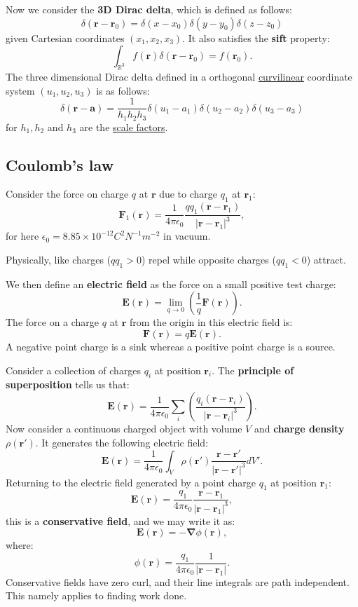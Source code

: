 \documentclass{article}
\begin{document}
Now we consider the \textbf{3D Dirac delta}, which is defined as follows:
$$\delta(\boldsymbol{r}-\boldsymbol{r}_0)=\delta(x-x_0)\delta(y-y_0)\delta(z-z_0)$$
given Cartesian coordinates $(x_1, x_2, x_3)$. It also satisfies the \textbf{sift} property:
$$\int_{\mathbb{R}^3}f(\boldsymbol{r})\delta(\boldsymbol{r}-\boldsymbol{r}_0)
=f(\boldsymbol{r}_0).$$
The three dimensional Dirac delta defined in a orthogonal \underline{curvilinear} coordinate system $(u_1, u_2, u_3)$ is as follows:
$$\delta(\boldsymbol{r}-\boldsymbol{a})=\frac{1}{h_1 h_2 h_3}
\delta(u_1-a_1)\delta(u_2-a_2)\delta(u_3-a_3)$$
for $h_1, h_2$ and $h_3$ are the \underline{scale factors}.

\newpage

\subsection{Coulomb's law}
Consider the force on charge $q$ at $\boldsymbol{r}$ due to charge $q_1$
at $\boldsymbol{r}_1$:
$$\boldsymbol{F}_1(\boldsymbol{r})=\frac{1}{4\pi\epsilon_0}
\frac{qq_1(\boldsymbol{r}-\boldsymbol{r}_1)}{|\boldsymbol{r}-\boldsymbol{r}_1|^3},$$
for here $\epsilon_0=8.85\times10^{-12}C^2N^{-1}m^{-2}$ in vacuum. 

Physically, like charges ($qq_1>0$) repel while opposite charges ($qq_1<0$) attract.

We then define an \textbf{electric field} as the force on a small positive test charge:
$$\boldsymbol{E}(\boldsymbol{r})=
\lim_{q\rightarrow 0}\left(\frac{1}{q}\boldsymbol{F}(\boldsymbol{r})\right).$$
The force on a charge $q$ at $\boldsymbol{r}$ from the origin in this electric field is:
$$\boldsymbol{F}(\boldsymbol{r})=q\boldsymbol{E}(\boldsymbol{r}).$$
A negative point charge is a sink whereas a positive point charge is a source.

Consider a collection of charges $q_i$ at position $\boldsymbol{r}_i$. The \textbf{principle of superposition} tells us that:
$$\boldsymbol{E}(\boldsymbol{r})=\frac{1}{4\pi\epsilon_0}
\sum_i \left(\frac{q_i (\boldsymbol{r}-\boldsymbol{r}_i)}
{|\boldsymbol{r}-\boldsymbol{r}_i|^3}\right).$$
Now consider a continuous charged object with volume $V$
and \textbf{charge density} $\rho(\boldsymbol{r}')$.
It generates the following electric field:
$$\boldsymbol{E}(\boldsymbol{r})=\frac{1}{4\pi\epsilon_0}
\int_V \rho(\boldsymbol{r}')\frac{\boldsymbol{r}-\boldsymbol{r}'}
{|\boldsymbol{r}-\boldsymbol{r}'|^3}dV'.$$
Returning to the electric field generated by a point charge $q_1$
at position $\boldsymbol{r}_1$:
$$\boldsymbol{E}(\boldsymbol{r})=\frac{q_1}{4\pi\epsilon_0}
\frac{\boldsymbol{r}-\boldsymbol{r}_1}{|\boldsymbol{r}-\boldsymbol{r}_1|^3},$$
this is a \textbf{conservative field}, and we may write it as:
$$\boldsymbol{E}(\boldsymbol{r})=-\boldsymbol{\nabla}\phi(\boldsymbol{r}),$$
where:
$$\phi(\boldsymbol{r})=\frac{q_1}{4\pi\epsilon_0}\frac{1}{|\boldsymbol{r}-\boldsymbol{r}_1|}.$$
Conservative fields have zero curl, and their line integrals are path independent. This namely applies to finding work done.
\end{document}
